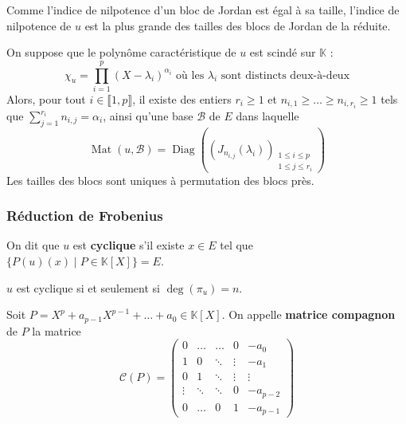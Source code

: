   \begin{remark}
    Comme l'indice de nilpotence d'un bloc de Jordan est égal à sa taille, l'indice de nilpotence de $u$ est la plus grande des tailles des blocs de Jordan de la réduite.
  \end{remark}


  \begin{theorem}
    On suppose que le polynôme caractéristique de $u$ est scindé sur $\mathbb{K}$ :
    \[ \chi_u = \prod_{i=1}^p (X - \lambda_i)^{\alpha_i} \text{ où les } \lambda_i \text{ sont distincts deux-à-deux} \]
    Alors, pour tout $i \in \llbracket 1,p \rrbracket$, il existe des entiers $r_i \geq 1$ et $n_{i,1} \geq \dots \geq n_{i,r_i} \geq 1$ tels que $\sum_{j=1}^{r_i} n_{i,j} = \alpha_i$, ainsi qu'une base $\mathcal{B}$ de $E$ dans laquelle
    \[ \operatorname{Mat}(u, \mathcal{B}) = \operatorname{Diag}\left(\left(J_{n_{i,j}}(\lambda_i)\right)_{\substack{1 \leq i \leq p \\ 1 \leq j \leq r_i}}\right) \]
    Les tailles des blocs sont uniques à permutation des blocs près.
  \end{theorem}

  \subsubsection{Réduction de Frobenius}


  \begin{definition}
    \label{151-2}
    On dit que $u$ est \textbf{cyclique} s'il existe $x \in E$ tel que $\{ P(u)(x) \mid P \in \mathbb{K}[X] \} = E$.
  \end{definition}

  \begin{proposition}
    $u$ est cyclique si et seulement si $\deg(\pi_u) = n$.
  \end{proposition}

  \begin{definition}
    Soit $P = X^p + a_{p-1} X^{p-1} + \dots + a_0 \in \mathbb{K}[X]$. On appelle \textbf{matrice compagnon} de $P$ la matrice
    \[ \mathcal{C}(P) = \begin{pmatrix} 0 & \dots & \dots & 0 & -a_0 \\ 1 & 0 & \ddots & \vdots & -a_1 \\ 0 & 1 & \ddots & \vdots & \vdots \\ \vdots & \ddots & \ddots & 0 & -a_{p-2} \\ 0 & \dots & 0 & 1 & -a_{p-1} \end{pmatrix} \]
  \end{definition}

